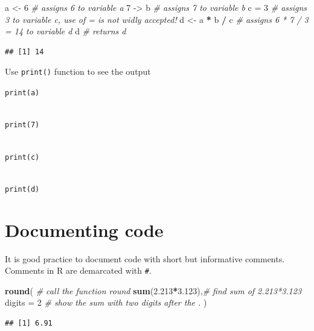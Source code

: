 \documentclass[
]{book}
\newenvironment{Shaded}{\begin{snugshade}}{\end{snugshade}}
\newcommand{\AttributeTok}[1]{\textcolor[rgb]{0.13,0.29,0.53}{#1}}
\newcommand{\CommentTok}[1]{\textcolor[rgb]{0.56,0.35,0.01}{\textit{#1}}}
\newcommand{\DecValTok}[1]{\textcolor[rgb]{0.00,0.00,0.81}{#1}}
\newcommand{\FloatTok}[1]{\textcolor[rgb]{0.00,0.00,0.81}{#1}}
\newcommand{\FunctionTok}[1]{\textcolor[rgb]{0.13,0.29,0.53}{\textbf{#1}}}
\newcommand{\NormalTok}[1]{#1}
\newcommand{\OtherTok}[1]{\textcolor[rgb]{0.56,0.35,0.01}{#1}}
\newcommand{\SpecialCharTok}[1]{\textcolor[rgb]{0.81,0.36,0.00}{\textbf{#1}}}
\begin{document}
\begin{Shaded}
\begin{Highlighting}[]
\NormalTok{a }\OtherTok{\textless{}{-}} \DecValTok{6}       \CommentTok{\# assigns 6 to variable a}
\DecValTok{7} \OtherTok{{-}\textgreater{}}\NormalTok{ b       }\CommentTok{\# assigns 7 to variable b}
\NormalTok{c }\OtherTok{=} \DecValTok{3}        \CommentTok{\# assigns 3 to variable c, use of = is not widly accepted!}
\NormalTok{d }\OtherTok{\textless{}{-}}\NormalTok{  a }\SpecialCharTok{*}\NormalTok{ b }\SpecialCharTok{/}\NormalTok{ c   }\CommentTok{\# assigns 6 * 7 / 3 = 14 to variable d}
\NormalTok{d           }\CommentTok{\# returns d}
\end{Highlighting}
\end{Shaded}

\begin{verbatim}
## [1] 14
\end{verbatim}

Use \texttt{print()} function to see the output

\texttt{print(a)}\strut \\
\texttt{print(7)}\strut \\
\texttt{print(c)}\strut \\
\texttt{print(d)}

\hypertarget{documenting-code}{%
\section{Documenting code}\label{documenting-code}}

It is good practice to document code with short but informative comments. Comments in R are demarcated with \texttt{\#}.

\begin{Shaded}
\begin{Highlighting}[]
\FunctionTok{round}\NormalTok{(             }\CommentTok{\# call the function \textasciigrave{}round\textasciigrave{}}
  \FunctionTok{sum}\NormalTok{(}\FloatTok{2.213}\SpecialCharTok{*}\FloatTok{3.123}\NormalTok{),}\CommentTok{\# find sum of 2.213*3.123}
  \AttributeTok{digits =} \DecValTok{2}       \CommentTok{\# show the sum with two digits after the \textasciigrave{}.\textasciigrave{}}
\NormalTok{)}
\end{Highlighting}
\end{Shaded}

\begin{verbatim}
## [1] 6.91
\end{verbatim}
\end{document}
